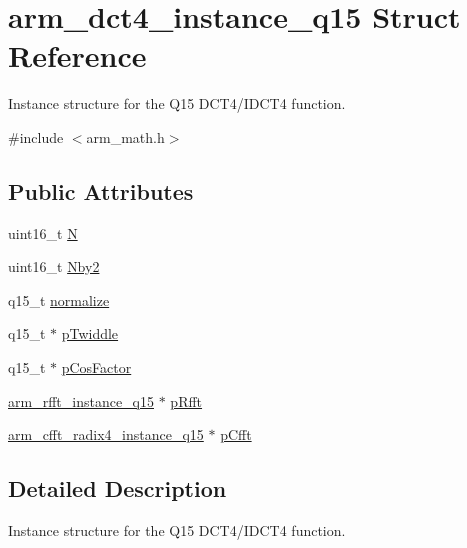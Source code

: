 \hypertarget{structarm__dct4__instance__q15}{\section{arm\-\_\-dct4\-\_\-instance\-\_\-q15 Struct Reference}
\label{structarm__dct4__instance__q15}
}


Instance structure for the Q15 D\-C\-T4/\-I\-D\-C\-T4 function.  




{\ttfamily \#include $<$arm\-\_\-math.\-h$>$}

\subsection*{Public Attributes}
\begin{DoxyCompactItemize}
\item 
uint16\-\_\-t \hyperlink{structarm__dct4__instance__q15_a53d24009bb9b2e93d0aa07db7f1a6c25}{N}
\item 
uint16\-\_\-t \hyperlink{structarm__dct4__instance__q15_af43dcbbc2fc661ffbc525afe3dcbd7da}{Nby2}
\item 
q15\-\_\-t \hyperlink{structarm__dct4__instance__q15_a197098140d68e89a08f7a249003a0b86}{normalize}
\item 
q15\-\_\-t $\ast$ \hyperlink{structarm__dct4__instance__q15_abc6c847e9f906781e1d5da40e9aafa76}{p\-Twiddle}
\item 
q15\-\_\-t $\ast$ \hyperlink{structarm__dct4__instance__q15_ac76df681b1bd502fb4874c06f055dded}{p\-Cos\-Factor}
\item 
\hyperlink{structarm__rfft__instance__q15}{arm\-\_\-rfft\-\_\-instance\-\_\-q15} $\ast$ \hyperlink{structarm__dct4__instance__q15_a11cf95c1cd9dd2dd5e4b81b8f88dc208}{p\-Rfft}
\item 
\hyperlink{structarm__cfft__radix4__instance__q15}{arm\-\_\-cfft\-\_\-radix4\-\_\-instance\-\_\-q15} $\ast$ \hyperlink{structarm__dct4__instance__q15_a7284932ee8c36107c33815eb62eadffc}{p\-Cfft}
\end{DoxyCompactItemize}


\subsection{Detailed Description}
Instance structure for the Q15 D\-C\-T4/\-I\-D\-C\-T4 function. 

